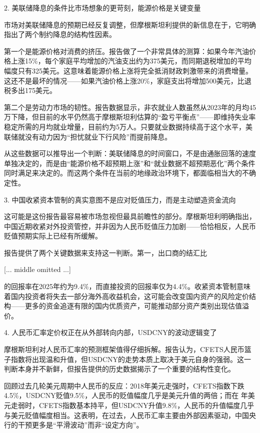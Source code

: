 \documentclass[11pt]{ctexart}
\begin{document}
2. 美联储降息的条件比市场想象的更苛刻，能源价格是关键变量

市场对美联储降息的预期已经反复调整，但摩根斯坦利提供的新信息在于，它明确指出了两个制约降息的结构性因素。

第一个是能源价格对消费的挤压。报告做了一个非常具体的测算：如果今年汽油价格上涨15\%，每个家庭平均增加的汽油支出约为375美元，而同期退税增加的平均幅度只有325美元。这意味着能源价格上涨将完全抵消财政刺激带来的消费增量。这还不是最坏的情况——如果汽油价格上涨20\%，家庭支出将增加500美元，比退税多出175美元。

第二个是劳动力市场的韧性。报告数据显示，非农就业人数虽然从2023年的月均45万下降，但目前的水平仍然高于摩根斯坦利估算的“盈亏平衡点”——即维持失业率稳定所需的月均就业增量，目前约为5万人。只要就业数据持续高于这个水平，美联储就没有动力因为“担忧就业下行风险”而提前降息。

从这些数据可以推导出一个判断：美联储降息的时间窗口，不是由通胀回落的速度单独决定的，而是由“能源价格不超预期上涨”和“就业数据不超预期恶化”两个条件同时满足来决定的。而这两个条件在当前的地缘政治环境下，都面临相当大的不确定性。

3. 中国收紧资本管制的真实意图不是应对贬值压力，而是主动塑造资金流向

这可能是这份报告最容易被市场忽视但最具前瞻性的部分。摩根斯坦利明确指出，中国近期收紧对外投资管控，并非因为人民币贬值压力加剧——恰恰相反，人民币贬值预期实际上已经有所缓解。

报告提供了两个关键数据来支持这一判断。第一，出口商的结汇比

[... middle omitted ...]

的回报率在2025年约为9.4\%，而直接投资的回报率仅为4.4\%。收紧资本管制意味着国内投资者将失去一部分海外高收益机会，这可能会改变国内资产的风险定价结构——更多的资金追逐有限的国内优质资产，可能推动部分资产类别出现估值溢价。

4. 人民币汇率定价权正在从外部转向内部，USDCNY的波动逻辑变了

摩根斯坦利对人民币汇率的预测框架值得仔细拆解。报告认为，CFETS人民币篮子指数将出现温和升值，但USDCNY的走势本质上取决于美元自身的强弱。这一判断本身并不新鲜，但报告提供的历史数据揭示了一个重要的结构性变化。

回顾过去几轮美元周期中人民币的反应：2018年美元走强时，CFETS指数下跌4.5\%，USDCNY贬值9.5\%，人民币的贬值幅度几乎是美元升值的两倍；而在 年美元走弱时，CFETS指数基本持平，但USDCNY升值9.8\%，人民币的升值幅度几乎与美元贬值幅度相当。这表明，在过去，人民币汇率主要由外部因素驱动，中国央行的干预更多是“平滑波动”而非“设定方向”。
\end{document}
